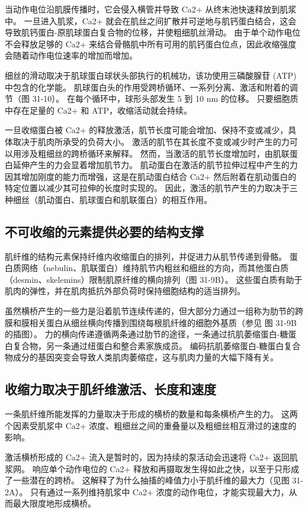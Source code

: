 当动作电位沿肌膜传播时，它会侵入横管并导致 Ca2+ 从终末池快速释放到肌浆中。 一旦进入肌浆，Ca2+ 就会在肌丝之间扩散并可逆地与肌钙蛋白结合，这会导致肌钙蛋白-原肌球蛋白复合物的位移，并使粗细肌丝滑动。 由于单个动作电位不会释放足够的 Ca2+ 来结合骨骼肌中所有可用的肌钙蛋白位点，因此收缩强度会随着动作电位速率的增加而增加。

细丝的滑动取决于肌球蛋白球状头部执行的机械功，该功使用三磷酸腺苷 (ATP) 中包含的化学能。 肌球蛋白头的作用受跨桥循环、一系列分离、激活和附着的调节（图 31-10）。 在每个循环中，球形头部发生 5 到 10 nm 的位移。 只要细胞质中存在足量的 Ca2+ 和 ATP，收缩活动就会持续。

一旦收缩蛋白被 Ca2+ 的释放激活，肌节长度可能会增加、保持不变或减少，具体取决于肌肉所承受的负荷大小。 激活的肌节在其长度不变或减少时产生的力可以用涉及粗细丝的跨桥循环来解释。 然而，当激活的肌节长度增加时，由肌联蛋白延伸产生的力会显着增加肌节力。 肌动蛋白在激活的肌节拉伸过程中产生的力因其增加刚度的能力而增强，这是在肌动蛋白结合 Ca2+ 然后附着在肌动蛋白的特定位置以减少其可拉伸的长度时实现的。 因此，激活的肌节产生的力取决于三种细丝（肌动蛋白、肌球蛋白和肌联蛋白）的相互作用。

\subsection{不可收缩的元素提供必要的结构支撑}
肌纤维的结构元素保持纤维内收缩蛋白的排列，并促进力从肌节传递到骨骼。 蛋白质网络（nebulin、肌联蛋白）维持肌节内粗丝和细丝的方向，而其他蛋白质（desmin、skelemins）限制肌原纤维的横向排列（图 31-9B）。 这些蛋白质有助于肌肉的弹性，并在肌肉抵抗外部负荷时保持细胞结构的适当排列。

虽然横桥产生的一些力是沿着肌节连续传递的，但大部分力通过一组称为肋节的跨膜和膜相关蛋白从细丝横向传播到围绕每根肌纤维的细胞外基质（参见 图 31-9B 的插图）。 力的横向传递遵循两条通过肋节的途径，一条通过抗肌萎缩蛋白-糖蛋白复合物，另一条通过纽蛋白和整合素家族成员。 编码抗肌萎缩蛋白-糖蛋白复合物成分的基因突变会导致人类肌肉萎缩症，这与肌肉力量的大幅下降有关。

\subsection{收缩力取决于肌纤维激活、长度和速度}
一条肌纤维所能发挥的力量取决于形成的横桥的数量和每条横桥产生的力。 这两个因素受肌浆中 Ca2+ 浓度、粗细丝之间的重叠量以及粗细丝相互滑过的速度的影响。

激活横桥形成的 Ca2+ 流入是暂时的，因为持续的泵活动会迅速将 Ca2+ 返回肌浆网。 响应单个动作电位的 Ca2+ 释放和再摄取发生得如此之快，以至于只形成了一些潜在的跨桥。 这解释了为什么抽搐的峰值力小于肌纤维的最大力（见图 31-2A）。 只有通过一系列维持肌浆中 Ca2+ 浓度的动作电位，才能实现最大力，从而最大限度地形成横桥。

